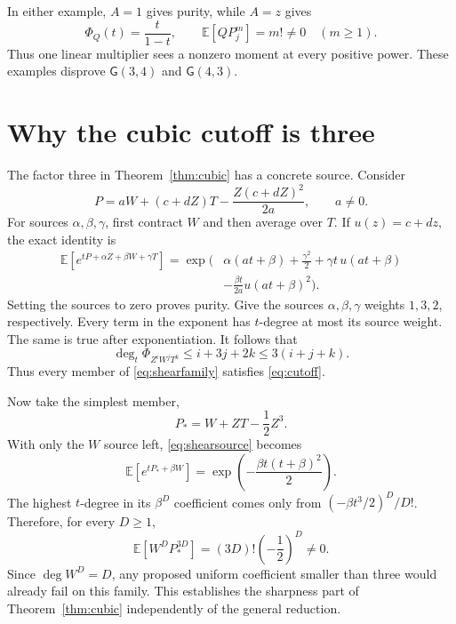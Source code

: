 \documentclass[11pt]{article}
\theoremstyle{definition}\newtheorem{definition}[theorem]{Definition}
\theoremstyle{remark}\newtheorem{remark}[theorem]{Remark}
\newcommand{\E}{\mathbb E}
\newcommand{\G}{\mathsf G}
\begin{document}
In either example, $A=1$ gives purity, while $A=z$ gives
\[
 \Phi_Q(t)=\frac{t}{1-t},\qquad
 \E[QP_j^m]=m!\ne0\quad(m\geq1).
\]
Thus one linear multiplier sees a nonzero moment at every positive
power. These examples disprove $\G(3,4)$ and $\G(4,3)$.

\section{Why the cubic cutoff is three}\label{sec:shear}

The factor three in Theorem~\ref{thm:cubic} has a concrete source.
Consider
\begin{equation}\label{eq:shearfamily}
 P=aW+(c+dZ)T-\frac{Z(c+dZ)^2}{2a},\qquad a\ne0.
\end{equation}
For sources $\alpha,\beta,\gamma$, first contract $W$ and then
average over $T$. If $u(z)=c+dz$, the exact identity is
\begin{equation}\label{eq:shearsource}
\begin{split}
 \E[e^{tP+\alpha Z+\beta W+\gamma T}]
  =\exp\biggl(&\alpha(at+\beta)+\frac{\gamma^2}{2}
       +\gamma t\,u(at+\beta)\\[-2pt]
       &-\frac{\beta t}{2a}u(at+\beta)^2\biggr).
\end{split}
\end{equation}
Setting the sources to zero proves purity. Give the sources
$\alpha,\beta,\gamma$ weights $1,3,2$, respectively. Every term in
the exponent has $t$-degree at most its source weight. The same is true
after exponentiation. It follows that
\[
 \deg_t\Phi_{Z^iW^jT^k}\leq i+3j+2k\leq3(i+j+k).
\]
Thus every member of \eqref{eq:shearfamily} satisfies
\eqref{eq:cutoff}.

Now take the simplest member,
\[
 P_*=W+ZT-\frac12 Z^3.
\]
With only the $W$ source left, \eqref{eq:shearsource} becomes
\[
 \E[e^{tP_*+\beta W}]
   =\exp\!\left(-\frac{\beta t(t+\beta)^2}{2}\right).
\]
The highest $t$-degree in its $\beta^D$ coefficient comes only from
$(-\beta t^3/2)^D/D!$. Therefore, for every $D\geq1$,
\begin{equation}\label{eq:sharp}
 \E[W^D P_*^{3D}]=(3D)!\left(-\frac12\right)^D\ne0.
\end{equation}
Since $\deg W^D=D$, any proposed uniform coefficient smaller than
three would already fail on this family. This establishes the sharpness
part of Theorem~\ref{thm:cubic} independently of the general reduction.
\end{document}
